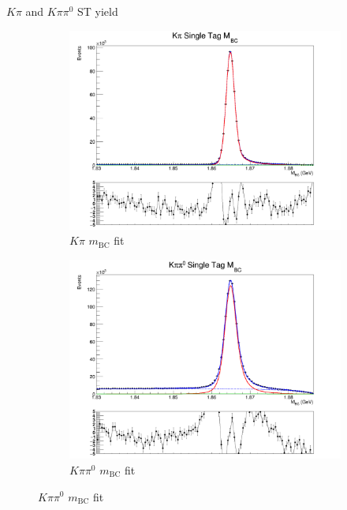 \documentclass{beamer}
\begin{document}
\begin{frame}{$K\pi$ and $K\pi\pi^0$ ST yield}
  \begin{figure}
    \centering
    \begin{subfigure}{0.5\textwidth}
      \centering
      \includegraphics[width=\textwidth]{kpiSingleTagMBCPlot.png}
      \caption{$K\pi$ $m_\text{BC}$ fit}
    \end{subfigure}%
    \begin{subfigure}{0.5\textwidth}
      \centering
      \includegraphics[width=\textwidth]{Kpipi0SingleTagMBCPlot.png}
      \caption{$K\pi\pi^0$ $m_\text{BC}$ fit}
    \end{subfigure}
  \end{figure}
\end{frame}
\end{document}
